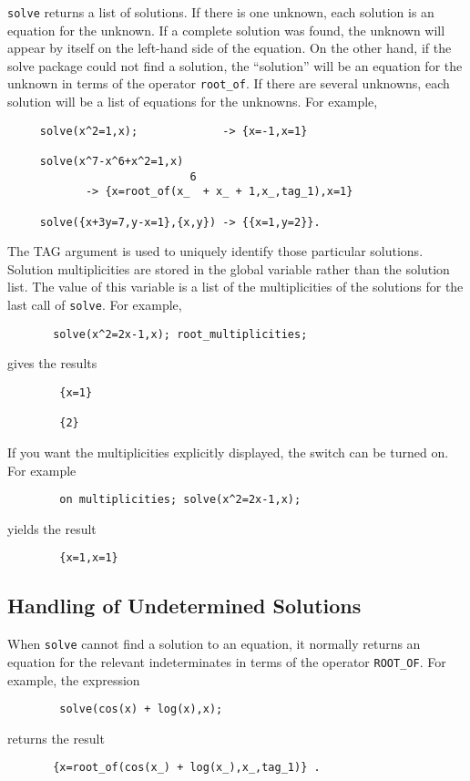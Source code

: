 \hypertarget{operator:ROOT_OF}{}
\texttt{solve} returns a list of solutions.  If there is one unknown, each
solution is an equation for the unknown.  If a complete solution was
found, the unknown will appear by itself on the left-hand side of the
equation.  On the other hand, if the solve package could not find a
solution, the ``solution'' will be an equation for the unknown in terms
of the operator \texttt{root\_of}. If there
are several unknowns, each solution will be a list of equations for the
unknowns.  For example,
\begin{verbatim}
     solve(x^2=1,x);             -> {x=-1,x=1}

     solve(x^7-x^6+x^2=1,x)
                            6
            -> {x=root_of(x_  + x_ + 1,x_,tag_1),x=1}

     solve({x+3y=7,y-x=1},{x,y}) -> {{x=1,y=2}}.
\end{verbatim}
\hypertarget{reserved:ROOT_MULTIPLICITIES}{}
The TAG argument is used to uniquely identify those particular solutions.
Solution multiplicities are stored in the global variable
 rather than the solution list.  The value of this
variable is a list of the multiplicities of the solutions for the last
call of \texttt{solve}.  For example,
\begin{verbatim}
       solve(x^2=2x-1,x); root_multiplicities;
\end{verbatim}
gives the results
\begin{verbatim}
        {x=1}

        {2}
\end{verbatim}

\hypertarget{switch:MULTIPLICITIES}{}
If you want the multiplicities explicitly displayed, the switch
 can be turned on. For example
\begin{verbatim}
        on multiplicities; solve(x^2=2x-1,x);
\end{verbatim}
yields the result
\begin{verbatim}
        {x=1,x=1}
\end{verbatim}

\subsection{Handling of Undetermined Solutions}
When \texttt{solve} cannot find a solution to an equation, it normally
returns an equation for the relevant indeterminates in terms of the
operator \texttt{ROOT\_OF}.  For example, the expression
\begin{verbatim}
        solve(cos(x) + log(x),x);
\end{verbatim}
returns the result
\begin{verbatim}
       {x=root_of(cos(x_) + log(x_),x_,tag_1)} .
\end{verbatim}

